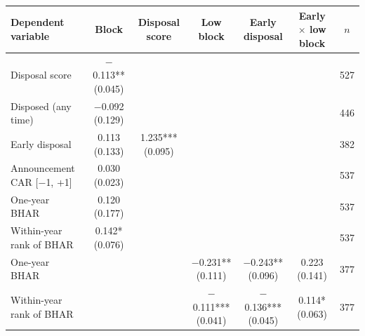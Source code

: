 \begin{tabular}{lcccccc}
\toprule
Dependent variable & Block & Disposal score & Low block & Early disposal & Early $\times$ low block & $n$ \\
\midrule
Disposal score & $-$0.113** (0.045) & & & & & 527 \\
Disposed (any time) & $-$0.092 (0.129) & & & & & 446 \\
Early disposal & 0.113 (0.133) & 1.235*** (0.095) & & & & 382 \\
Announcement CAR [$-$1, +1] & 0.030 (0.023) & & & & & 537 \\
One-year BHAR & 0.120 (0.177) & & & & & 537 \\
Within-year rank of BHAR & 0.142* (0.076) & & & & & 537 \\
One-year BHAR & & & $-$0.231** (0.111) & $-$0.243** (0.096) & 0.223 (0.141) & 377 \\
Within-year rank of BHAR & & & $-$0.111*** (0.041) & $-$0.136*** (0.045) & 0.114* (0.063) & 377 \\
\bottomrule
\end{tabular}
